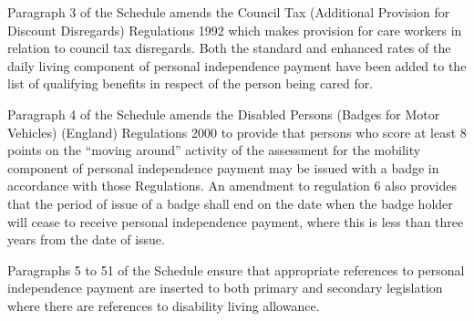 \documentclass[12pt,a4paper]{article}
\begin{document}
Paragraph 3 of the Schedule amends the Council Tax (Additional Provision for Discount Disregards) Regulations 1992 which makes provision for care workers in relation to council tax disregards. Both the standard and enhanced rates of the daily living component of personal independence payment have been added to the list of qualifying benefits in respect of the person being cared for.

Paragraph 4 of the Schedule amends the Disabled Persons (Badges for Motor Vehicles) (England) Regulations 2000 to provide that persons who score at least 8 points on the “moving around” activity of the assessment for the mobility component of personal independence payment may be issued with a badge in accordance with those Regulations. An amendment to regulation 6 also provides that the period of issue of a badge shall end on the date when the badge holder will cease to receive personal independence payment, where this is less than three years from the date of issue.

Paragraphs 5 to 51 of the Schedule ensure that appropriate references to personal independence payment are inserted to both primary and secondary legislation where there are references to disability living allowance. 
\end{document}
